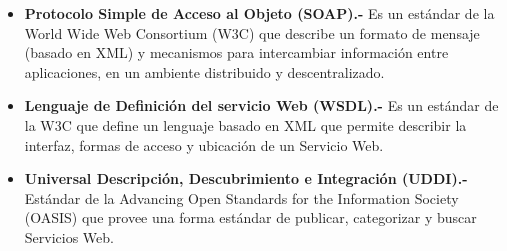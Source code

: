 \documentclass[12pt,letterpaper,titlepage]{article}
\begin{document}
\begin{itemize}\itemsep=0pt
\item  \textbf{Protocolo Simple de Acceso al Objeto (SOAP).-} Es un estándar de la World Wide Web Consortium (W3C) que describe un formato de mensaje (basado en XML) y mecanismos para intercambiar información entre aplicaciones, en un ambiente distribuido y descentralizado.
\item  \textbf{Lenguaje de Definición del servicio Web (WSDL).-} Es un estándar de la W3C que define un lenguaje basado en XML que permite describir la interfaz, formas de acceso y ubicación de un Servicio Web.
\item  \textbf{Universal Descripción, Descubrimiento e Integración (UDDI).-} Estándar de la
Advancing Open Standards for the Information Society (OASIS) que provee una forma estándar de publicar, categorizar y buscar Servicios Web.
\end{itemize}




\newpage

%
%

\end{document}

